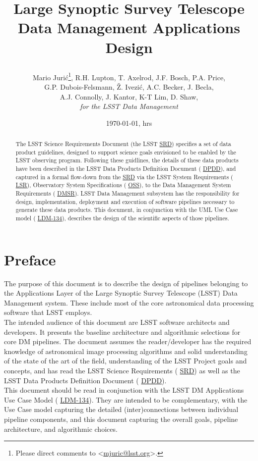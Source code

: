 \documentclass[12pt]{article}
\title{Large Synoptic Survey Telescope \\
Data Management Applications Design \\
{\author{
    Mario Juri\'c\footnote{Please direct comments to \textless\href{mailto:mjuric@lsst.org}{mjuric@lsst.org}\textgreater.},
    R.H. Lupton, T. Axelrod, J.F. Bosch, P.A. Price, \\
    G.P. Dubois-Felsmann, \v{Z}. Ivezi\'c, A.C. Becker, J. Becla,  \\ 
     A.J. Connolly, J. Kantor, K-T Lim, D. Shaw, \\
    {\em for the LSST Data Management}
}}}
\newcommand{\ds}[2]{{\color{blue} \href{https://docushare.lsstcorp.org/docushare/dsweb/Get/#1}{#2}}\xspace}
\newcommand{\SRD}{\ds{LPM-17}{SRD}}
\newcommand{\DPDD}{\ds{LSE-163}{DPDD}}
\newcommand{\LSR}{\ds{LSE-29}{LSR}}
\newcommand{\OSS}{\ds{LSE-30}{OSS}}
\newcommand{\DMSR}{\ds{LSE-61}{DMSR}}
\newcommand{\appsUMLusecase}{\ds{LDM-134}{LDM-134}}
\begin{document}
\date{\today, \currenttime hrs}
\maketitle
\pagestyle{headings}

\begin{abstract}
The LSST Science Requirements Document (the LSST \SRD) specifies a set of
data product guidelines, designed to support science goals envisioned to be enabled by the LSST observing program. Following these guidlines, the details of these data products have been described in the LSST Data Products Definition Document (\DPDD), and captured in a formal flow-down from the \SRD via the LSST System Requirements (\LSR), Observatory System Specifications (\OSS), to the Data Management System Requirements (\DMSR).
LSST Data Management subsystem has the responsibility for design, implementation, deployment and execution of software pipelines necessary to generate these data products. This document, in conjunction with the UML Use Case model (\appsUMLusecase), describes the design of the scientific aspects of those pipelines.
\end{abstract}

\clearpage

\tableofcontents

\clearpage

\section{Preface}

The purpose of this document is to describe the design of pipelines belonging to the Applications Layer of the Large Synoptic Survey Telescope (LSST) Data Management system. These include most of the core astronomical data processing software that LSST employs.
\\

The intended audience of this document are LSST software architects and developers. It presents the baseline architecture and algorithmic selections for core DM pipelines. The document assumes the reader/developer has the required knowledge of astronomical image processing algorithms and solid understanding of the state of the art of the field, understanding of the LSST Project goals and concepts, and has read the LSST Science Requirements (\SRD) as well as the LSST Data Products Definition Document (\DPDD).
\\

This document should be read in conjunction with the LSST DM Applications Use Case Model (\appsUMLusecase). They are intended to be complementary, with the Use Case model capturing the detailed (inter)connections between individual pipeline components, and this document capturing the overall goals, pipeline architecture, and algorithmic choices.
\\
\end{document}
